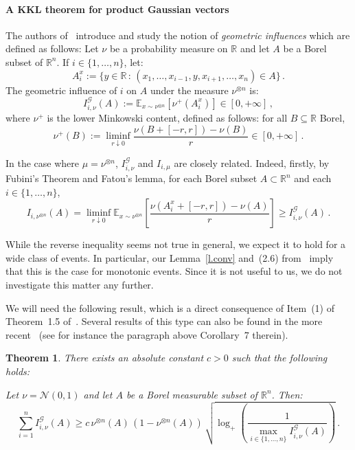 \documentclass[11pt]{article}
\newtheorem{theo}{Theorem}[section]
\theoremstyle{definition}
\numberwithin{equation}{section}
\newcommand{\R}{\mathbb{R}}
\newcommand{\E}{\mathbb{E}}
\newcommand*\calG{\mathcal{G}}
\begin{document}
\paragraph{A KKL theorem for product Gaussian vectors} The authors of~\cite{keller2012geometric} introduce and study the notion of \emph{geometric influences} which are defined as follows: Let $\nu$ be a probability measure on $\R$ and let $A$ be a Borel subset of $\R^n$. If $i \in \lbrace 1,\dots, n \rbrace$, let:
\[
A_i^x := \lbrace y \in \R \, : \, (x_1,\dots, x_{i-1}, y, x_{i+1},\dots, x_n) \in A \rbrace \,.
\]
The geometric influence of $i$ on $A$ under the measure $\nu^{\otimes n}$ is:
\[
I^\mathcal{G}_{i,\nu}(A) := \E_{x \sim \nu^{\otimes n}} \left[\nu^+(A_i^x) \right] \in [0,+\infty] \,,
\]
where $\nu^+$ is the lower Minkowski content, defined as follows: for all $B \subseteq \R$ Borel,
\[
\nu^+(B) := \underset{r \downarrow 0}{\liminf} \frac{\nu\left(B+[-r,r]\right) - \nu \left(B\right)}{r} \in [0,+\infty] \,.
\]


In the case where $\mu=\nu^{\otimes n}$, $I^\calG_{i,\nu}$ and $I_{i,\mu}$ are closely related. Indeed, firstly, by Fubini's Theorem and Fatou's lemma, for each Borel subset $A\subset\R^n$ and each $i\in\{1,\dots,n\}$,
\begin{equation}\label{e.KMS.Fatou}
I_{i,\nu^{\otimes n}}(A)=\liminf_{r\downarrow 0} \E_{x \sim \nu^{\otimes n}} \left[\frac{\nu(A_i^x+[-r,r]) - \nu(A)}{r} \right]\geq I^\calG_{i,\nu}(A) \,.
\end{equation}

While the reverse inequality seems not true in general, we expect it to hold for a wide class of events. In particular, our Lemma~\ref{l.conv} and~(2.6) from~\cite{keller2012geometric} imply that this is the case for monotonic events. Since it is not useful to us, we do not investigate this matter any further.

We will need the following result, which is a direct consequence of Item~(1) of Theorem~1.5 of~\cite{keller2012geometric}. Several results of this type can also be found in the more recent~\cite{cordero2012hypercontractive} (see for instance the paragraph above Corollary~7 therein).

\begin{theo}\label{t.KMS}
There exists an absolute constant $c > 0$ such that the following holds:

Let $\nu = \mathcal{N}(0,1)$ and let $A$ be a Borel measurable subset of $\R^n$. Then:
\[
\sum_{i=1}^n I^\mathcal{G}_{i,\nu}(A) \geq c \, \nu^{\otimes n}(A) \, (1-\nu^{\otimes n}(A)) \, \sqrt{\log_+ \left(\frac{1}{\max_{i \in \lbrace 1,\dots, n \rbrace} I^\mathcal{G}_{i,\nu}(A)}\right) } \,.
\]
\end{theo}
\end{document}
